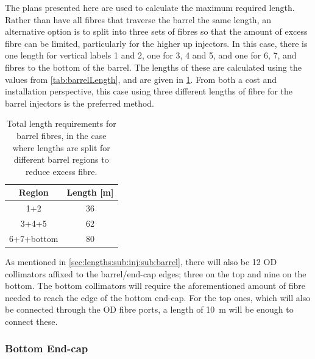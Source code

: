 \documentclass[a4paper,11pt]{article}
\begin{document}
The plans presented here are used to calculate the maximum required length. Rather than have all fibres that traverse the barrel the same length, an alternative option is to split into three sets of fibres so that the amount of excess fibre can be limited, particularly for the higher up injectors. In this case, there is one length for vertical labels 1 and 2, one for 3, 4 and 5, and one for 6, 7, and fibres to the bottom of the barrel. The lengths of these are calculated using the values from \cref{tab:barrelLength}, and are given in \cref{tab:barrelLengthSplit}. From both a cost and installation perspective, this case using three different lengths of fibre for the barrel injectors is the preferred method.
\begin{table}[h!]
\centering
\begin{tabular}{cc}\toprule
Region		&		Length [m]		\\ \midrule
1+2			&		36	\\
3+4+5		&		62	\\
6+7+bottom	&		80	\\ \bottomrule
\end{tabular}
\caption{Total length requirements for barrel fibres, in the case where lengths are split for different barrel regions to reduce excess fibre.}\label{tab:barrelLengthSplit}
\end{table}

As mentioned in \cref{sec:lengths:sub:inj:sub:barrel}, there will also be 12 OD collimators affixed to the barrel/end-cap edges; three on the top and nine on the bottom. The bottom collimators will require the aforementioned amount of fibre needed to reach the edge of the bottom end-cap. For the top ones, which will also be connected through the OD fibre ports, a length of 10~m will be enough to connect these.

\subsubsection{Bottom End-cap}\label{sec:lengths:sub:len:sub:bottom}
\end{document}
